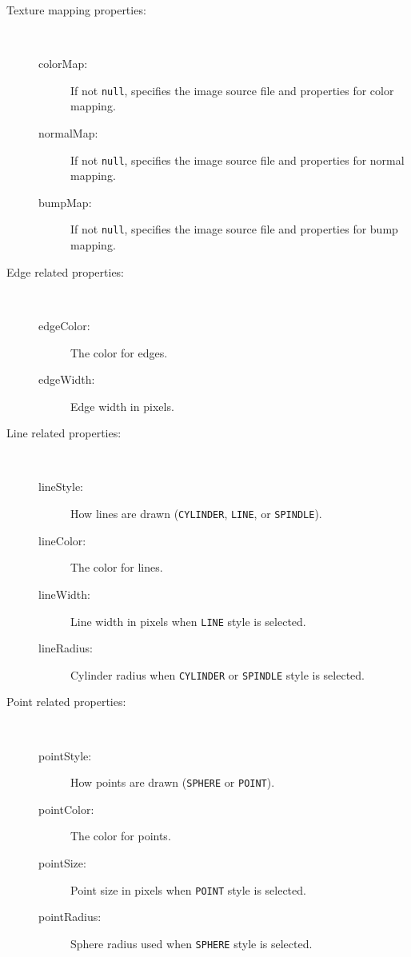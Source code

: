 \documentclass{article}
\begin{document}
\begin{description}
\item[Texture mapping properties:]
\hfil \\
\begin{description}
\item[colorMap:]
If not {\tt null}, specifies the image source file and properties
for color mapping.
\item[normalMap:]
If not {\tt null}, specifies the image source file and properties
for normal mapping.
\item[bumpMap:]
If not {\tt null}, specifies the image source file and properties
for bump mapping.
\end{description}

\item[Edge related properties:]
\hfil \\
\begin{description}
\item[edgeColor:]
The color for edges.
\item[edgeWidth:]
Edge width in pixels.
\end{description}

\item[Line related properties:]
\hfil \\
\begin{description}
\item[lineStyle:] 
How lines are drawn ({\tt CYLINDER}, {\tt LINE}, or {\tt SPINDLE}).
\item[lineColor:]
The color for lines.
\item[lineWidth:]
Line width in pixels when {\tt LINE} style is selected.
\item[lineRadius:]
Cylinder radius when {\tt CYLINDER} or {\tt SPINDLE} style is selected.
\end{description}

\item[Point related properties:]
\hfil \\
\begin{description}
\item[pointStyle:] 
How points are drawn ({\tt SPHERE} or {\tt POINT}).
\item[pointColor:] 
The color for points.
\item[pointSize:] 
Point size in pixels when {\tt POINT} style is selected.
\item[pointRadius:] 	
Sphere radius used when {\tt SPHERE} style is selected.
\end{description}

\end{description}
\end{document}
